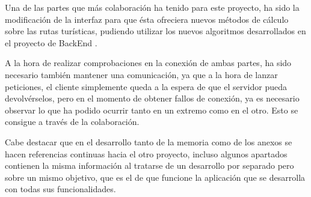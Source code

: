 Una de las partes que más colaboración ha tenido para este proyecto, ha sido la modificación de la interfaz para que ésta ofreciera nuevos métodos de cálculo sobre las rutas turísticas, pudiendo utilizar los nuevos algoritmos desarrollados en el proyecto de BackEnd \cite{tfg2}.

A la hora de realizar comprobaciones en la conexión de ambas partes, ha sido necesario también mantener una comunicación, ya que a la hora de lanzar peticiones, el cliente simplemente queda a la espera de que el servidor pueda devolvérselos, pero en el momento de obtener fallos de conexión, ya es necesario observar lo que ha podido ocurrir tanto en un extremo como en el otro. Esto se consigue a través de la colaboración.

Cabe destacar que en el desarrollo tanto de la memoria como de los anexos se hacen referencias continuas hacia el otro proyecto, incluso algunos apartados contienen la misma información al tratarse de un desarrollo por separado pero sobre un mismo objetivo, que es el de que funcione la aplicación que se desarrolla con todas sus funcionalidades.